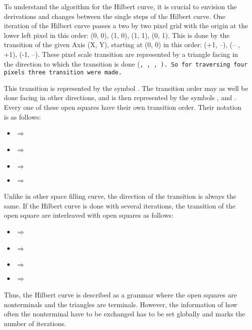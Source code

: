To understand the algorithm for the Hilbert curve, it is crucial to envision the derivations and changes between the single steps of the Hilbert curve. One iteration of the Hilbert curve passes a two by two pixel grid with the origin at the lower left pixel in this order: (0, 0), (1, 0), (1, 1), (0, 1). This is done by the transition of the given Axis (X, Y), starting at (0, 0) in this order: (+1, --), (-- , +1), (-1, --). These pixel scale transition are represented by a triangle facing in the direction to which the transition is done (\tt, \tl, \tb, \tr). So for traversing four pixels three transition were made.

This transition is represented by the symbol \sqr. The transition order may as well be done facing in other directions, and is then represented by the symbols \sqt, \sql and \sqb. Every one of these open squares have their own transition order. Their notation is as follows:

\begin{itemize}%
   \item \sqr $\Rightarrow$ \tr \tt \tl
   \item \sqt $\Rightarrow$ \tt \tr \tb
   \item \sql $\Rightarrow$ \tl \tb \tr
   \item \sqb $\Rightarrow$ \tb \tl \tt
\end{itemize}%

Unlike in other space filling curve, the direction of the transition is always the same. If the Hilbert curve is done with several iterations, the transition of the open square are interleaved with open squares as follows:

\begin{itemize}%
   \item \sqr $\Rightarrow$ \sqt  \tr  \sqr  \tt  \sqr  \tl \sqb
   \item \sqt $\Rightarrow$ \sqr  \tt  \sqt  \tr  \sqt  \tb  \sql
   \item \sql $\Rightarrow$ \sqb  \tl  \sql  \tb  \sql  \tr  \sqt
   \item \sqb $\Rightarrow$ \sql  \tb  \sqb  \tl  \sqb  \tt  \sqr
\end{itemize}%

Thus, the Hilbert curve is described as a grammar where the open squares are nonterminals and the triangles are terminals. However, the information of how often the nonterminal have to be exchanged has to be set globally and marks the number of iterations.

